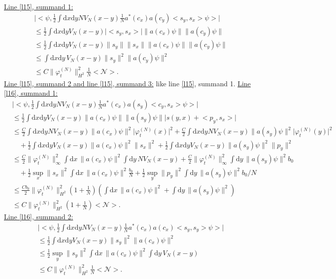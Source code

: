 \documentclass[11pt,a4paper,draft,DIV11]{scrartcl}	%
\newcommand{\di}{\textrm{d}}		%
\newcommand{\Ncal}{\mathcal{N}}		%
\newcommand{\estlist}[2]{\underline{Line \ref{l#1}, summand #2:}}
\newcommand{\nestlist}[2]{line \ref{l#1}, summand #2}
\newcommand{\Nestlist}[2]{Line \ref{l#1}, summand #2}
\newcommand{\scal}[2]{\big<#1,#2\big>} %
\newcommand{\norm}[1]{\lVert#1\rVert}	%
\newcommand{\ev}[1]{\big<#1\big>}	%
\newcommand{\ph}{\varphi_t^{(N)}}	%
\newcommand{\dxyNV}{\frac{1}{2}\int \di x\di y N V_N(x-y)} %
\newcommand{\dxyV}{\frac{1}{2}\int \di x\di y V_N(x-y)} %
\begin{document}
\estlist{15}{1}
\begin{align*}
& \lvert \scal{\psi}{\dxyNV \frac{1}{N}a^\ast(c_x)a(c_y) \scal{s_y}{s_x}\psi} \rvert \\
& \leq \dxyV \lvert \scal{s_y}{s_x}\rvert \norm{a(c_x)\psi} \norm{a(c_y)\psi} \\
& \leq \dxyV \norm{s_y} \norm{s_x} \norm{a(c_x)\psi} \norm{a(c_y)\psi} \\
& \leq \int \di x \di y\, V_N(x-y) \norm{s_y}^2 \norm{a(c_y)\psi}^2 \\
& \leq C \norm{\ph}_{H^2}^2 \frac{1}{N}\ev{\Ncal}. 
\end{align*}
\underline{\Nestlist{15}{2} and \nestlist{15}{3}:} like \nestlist{15}{1}.\newline
\estlist{16}{1}
\begin{align*}
& \lvert \scal{\psi}{\dxyNV \frac{1}{N}a^\ast(c_x) a(s_y) \scal{c_y}{s_x}\psi} \rvert \\
& \leq \dxyV \norm{a(c_x)\psi} \norm{a(s_y)\psi} \lvert s(y,x)+\scal{p_y}{s_x} \rvert \\
& \leq \frac{C}{2}\int \di x\di y N V_N(x-y) \norm{a(c_x)\psi}^2 \lvert \ph(x)\rvert^2 + \frac{C}{2}\int \di x\di y N V_N(x-y) \norm{a(s_y)\psi}^2 \lvert \ph(y)\rvert^2\\
& \quad + \dxyV \norm{a(c_x)\psi}^2 \norm{s_x}^2 + \dxyV \norm{a(s_y)\psi}^2 \norm{p_y}^2 \\
& \leq \frac{C}{2} \norm{\ph}_\infty^2 \int \di x\, \norm{a(c_x)\psi}^2 \int \di y\, NV_N(x-y) + \frac{C}{2} \norm{\ph}_\infty^2 \int \di y\, \norm{a(s_y)\psi}^2 b_0 \\
& \quad + \frac{1}{2}\sup_x\norm{s_x}^2 \int \di x\, \norm{a(c_x)\psi}^2 \frac{b_0}{N} + \frac{1}{2} \sup_y \norm{p_y}^2 \int \di y\, \norm{a(s_y)\psi}^2 b_0/N \\
& \leq \frac{C b_0}{2} \norm{\ph}_{H^2}^2(1+\frac{1}{N})\left( \int \di x\,\norm{a(c_x)\psi}^2 + \int \di y\,\norm{a(s_y)\psi}^2 \right) \\
& \leq C\norm{\ph}_{H^2}^2 \left(1+\frac{1}{N}\right)\ev{\Ncal}.
\end{align*}
\estlist{16}{2}
\begin{align*}
& \lvert \scal{\psi}{\dxyNV \frac{1}{N} a^\ast(c_x) a(c_x)\scal{s_y}{s_y}\psi} \rvert \\
& \leq \dxyV \norm{s_y}^2 \norm{a(c_x)\psi}^2 \\
& \leq \frac{1}{2} \sup_y \norm{s_y}^2 \int \di x\, \norm{a(c_x)\psi}^2 \int \di y\, V_N(x-y) \\
& \leq C\norm{\ph}_{H^2}^2 \frac{1}{N}\ev{\Ncal}.
\end{align*}
\end{document}
